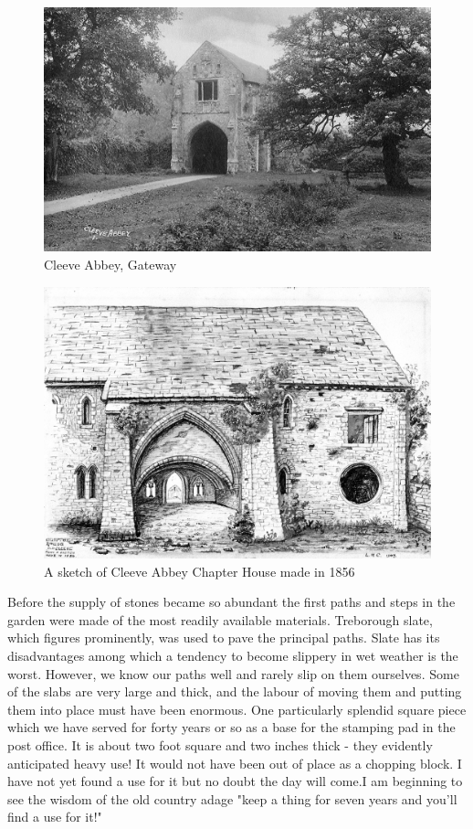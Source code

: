 \begin{figure}
	\centering
     \includegraphics[width=1\textwidth]{figures/CleeveAbbey}
     \caption{Cleeve Abbey, Gateway}
     \label{fig:CleeveAbbey}
\end{figure}

\begin{figure}
	\centering
     \includegraphics[width=1\textwidth]{figures/ChapterHouse}
     \caption{A sketch of Cleeve Abbey Chapter House made in 1856}
     \label{fig:ChapterHouse}
\end{figure}

Before the supply of stones became so abundant the first paths and steps in the garden were made of the most readily available materials. Treborough slate, which figures prominently, was used to pave the principal paths. Slate has its disadvantages among which a tendency to become slippery in wet weather is the worst. However, we know our paths well and rarely slip on them ourselves. Some of the slabs are very large and thick, and the labour of moving them and putting them into place must have been enormous. One particularly splendid square piece which we have served for forty years or so as a base for the stamping pad in the post office. It is about two foot square and two inches thick - they evidently anticipated heavy use! It would not have been out of place as a chopping block. I have not yet found a use for it but no doubt the day will come.I am beginning to see the wisdom of the old country adage "keep a thing for seven years and you'll find a use for it!"

